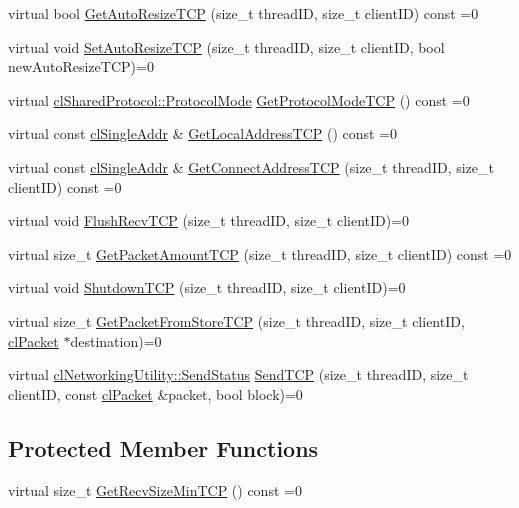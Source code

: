 \begin{DoxyCompactItemize}
\item 
virtual bool \hyperlink{classcl_instance_t_c_p_a2680e4844a26f13f593634982fb77343}{GetAutoResizeTCP} (size\_\-t threadID, size\_\-t clientID) const =0
\item 
virtual void \hyperlink{classcl_instance_t_c_p_aa2f17e01ca732a1692d5c1abab70f343}{SetAutoResizeTCP} (size\_\-t threadID, size\_\-t clientID, bool newAutoResizeTCP)=0
\item 
virtual \hyperlink{classcl_shared_protocol_a4b0b9c82b8ae4eee78c6308c35afd47b}{clSharedProtocol::ProtocolMode} \hyperlink{classcl_instance_t_c_p_a80ec758cf218a01fa6ad5ca77289b11a}{GetProtocolModeTCP} () const =0
\item 
virtual const \hyperlink{classcl_single_addr}{clSingleAddr} \& \hyperlink{classcl_instance_t_c_p_a16f0d87a9b4f577ae81b4f9fc3a3b182}{GetLocalAddressTCP} () const =0
\item 
virtual const \hyperlink{classcl_single_addr}{clSingleAddr} \& \hyperlink{classcl_instance_t_c_p_ad702ce7451f0c80a59861b13c9a4d5d8}{GetConnectAddressTCP} (size\_\-t threadID, size\_\-t clientID) const =0
\item 
virtual void \hyperlink{classcl_instance_t_c_p_af99126459308bfabf259aa9a2170a36b}{FlushRecvTCP} (size\_\-t threadID, size\_\-t clientID)=0
\item 
virtual size\_\-t \hyperlink{classcl_instance_t_c_p_a193776679f0af0fdb98ac91c6db6f3d1}{GetPacketAmountTCP} (size\_\-t threadID, size\_\-t clientID) const =0
\item 
virtual void \hyperlink{classcl_instance_t_c_p_acb97c70b1a0cdba98fd4ac0a658ed6ec}{ShutdownTCP} (size\_\-t threadID, size\_\-t clientID)=0
\item 
virtual size\_\-t \hyperlink{classcl_instance_t_c_p_afd639273cee92d3c612c40c761ec6d5b}{GetPacketFromStoreTCP} (size\_\-t threadID, size\_\-t clientID, \hyperlink{classcl_packet}{clPacket} $\ast$destination)=0
\item 
virtual \hyperlink{classcl_networking_utility_a19389cda12603396e03caa9d82073803}{clNetworkingUtility::SendStatus} \hyperlink{classcl_instance_t_c_p_a155def07aa6e36251e3d629111a70bc4}{SendTCP} (size\_\-t threadID, size\_\-t clientID, const \hyperlink{classcl_packet}{clPacket} \&packet, bool block)=0
\end{DoxyCompactItemize}
\subsection*{Protected Member Functions}
\begin{DoxyCompactItemize}
\item 
virtual size\_\-t \hyperlink{classcl_instance_t_c_p_a14fbd5458779f3f5a569e8aa57362ee7}{GetRecvSizeMinTCP} () const =0
\end{DoxyCompactItemize}

